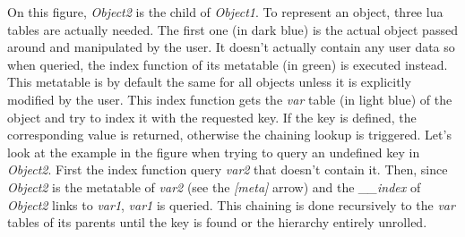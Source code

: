 On this figure, \emph{Object2} is the child of \emph{Object1}. To represent an
object, three lua tables are actually needed. The first one (in dark blue) is
the actual object passed around and manipulated by the user. It doesn't actually
contain any user data so when queried, the index function of its metatable (in
green) is executed instead. This metatable is by default the same for all objects
unless it is explicitly modified by the user. This index function gets the
\emph{var} table (in light blue) of the object and try to index it with the
requested key. If the key is defined, the corresponding value is returned,
otherwise the chaining lookup is triggered. Let's look at the example in the
figure when trying to query an undefined key in \emph{Object2}.
First the index function query \emph{var2} that doesn't contain it. Then, since
\emph{Object2} is the metatable of \emph{var2} (see the \emph{[meta]} arrow) and
the \emph{\_\_index} of \emph{Object2} links to \emph{var1}, \emph{var1} is queried.
This chaining is done recursively to the \emph{var} tables of its parents until the
key is found or the hierarchy entirely unrolled.
